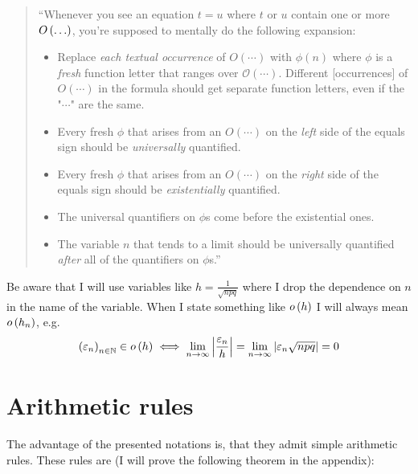 \begin{quote}
  ``Whenever you see an equation $t=u$ where $t$ or $u$ contain one or more $O\left( {\ldots} \right)$, you're supposed to mentally do the following expansion:
  \begin{itemize}
    \item Replace \emph{each textual occurrence} of $O(\cdots)$ with $\phi(n)$ where $\phi$ is a \emph{fresh} function letter that ranges over $\mathcal O(\cdots)$. Different [occurrences] of $O(\cdots)$ in the formula should get separate function letters, even if the "$\cdots$" are the same.
    \item Every fresh $\phi$ that arises from an $O(\cdots)$ on the \emph{left} side of the equals sign should be \emph{universally} quantified.
    \item Every fresh $\phi$ that arises from an $O(\cdots)$ on the \emph{right} side of the equals sign should be \emph{existentially} quantified.
    \item The universal quantifiers on $\phi$s come before the existential ones.
    \item The variable $n$ that tends to a limit should be universally quantified \emph{after} all of the quantifiers on $\phi$s.''
  \end{itemize}
\end{quote}

\begin{remark}
  Be aware that I will use variables like $h=\frac{1}{\sqrt{npq}}$ where I drop the dependence on $n$ in the name of the variable. When I state something like $o\left( {h} \right)$ I will always mean $o\left( {h_n} \right)$, e.g.
  \begin{align}
    \left({\varepsilon_n}\right)_{{n}\in\mathbb N} \in o\left( {h} \right) \iff \lim_{n\to\infty} \left|{\frac{\varepsilon_n}{h}}\right| = \lim_{n\to\infty} \left|{\varepsilon_n \sqrt{npq}}\right| = 0
  \end{align}
\end{remark}

\section{Arithmetic rules}

The advantage of the presented notations is, that they admit simple arithmetic rules. These rules are (I will prove the following theorem in the appendix):


